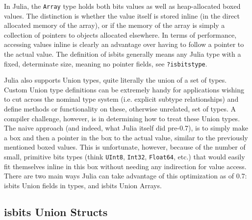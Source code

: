 In Julia, the \texttt{Array} type holds both {\textquotedbl}bits{\textquotedbl} values as well as heap-allocated {\textquotedbl}boxed{\textquotedbl} values. The distinction is whether the value itself is stored inline (in the direct allocated memory of the array), or if the memory of the array is simply a collection of pointers to objects allocated elsewhere. In terms of performance, accessing values inline is clearly an advantage over having to follow a pointer to the actual value. The definition of {\textquotedbl}isbits{\textquotedbl} generally means any Julia type with a fixed, determinate size, meaning no {\textquotedbl}pointer{\textquotedbl} fields, see \texttt{?isbitstype}.



Julia also supports Union types, quite literally the union of a set of types. Custom Union type definitions can be extremely handy for applications wishing to {\textquotedbl}cut across{\textquotedbl} the nominal type system (i.e. explicit subtype relationships) and define methods or functionality on these, otherwise unrelated, set of types. A compiler challenge, however, is in determining how to treat these Union types. The naive approach (and indeed, what Julia itself did pre-0.7), is to simply make a {\textquotedbl}box{\textquotedbl} and then a pointer in the box to the actual value, similar to the previously mentioned {\textquotedbl}boxed{\textquotedbl} values. This is unfortunate, however, because of the number of small, primitive {\textquotedbl}bits{\textquotedbl} types (think \texttt{UInt8}, \texttt{Int32}, \texttt{Float64}, etc.) that would easily fit themselves inline in this {\textquotedbl}box{\textquotedbl} without needing any indirection for value access. There are two main ways Julia can take advantage of this optimization as of 0.7: isbits Union fields in types, and isbits Union Arrays.



\hypertarget{4239563333738868441}{}


\subsection{isbits Union Structs}



